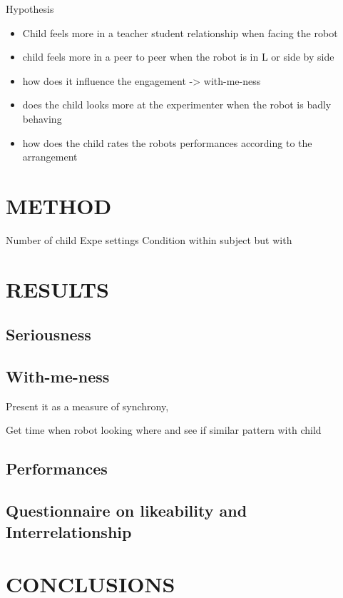 \documentclass[letterpaper, 10 pt, conference]{ieeeconf}  %
\begin{document}
Hypothesis
\begin{itemize}
\item Child feels more in a teacher student relationship when facing the robot
\item child feels more in a peer to peer when the robot is in L or side by side 
\item how does it influence the engagement -> with-me-ness
\item  does the child looks more at the experimenter when the robot is badly behaving
\item how does the child rates the robots performances according to  the arrangement
\end{itemize}


\section{METHOD}
Number of child
Expe settings
Condition within subject but with 

\section{RESULTS}

\subsection{Seriousness}

\subsection{With-me-ness}
Present it as a measure of synchrony, 

Get time when robot looking where and see if similar pattern with child

\subsection{Performances}

\subsection{Questionnaire on likeability and Interrelationship}

\section{CONCLUSIONS}
\end{document}
